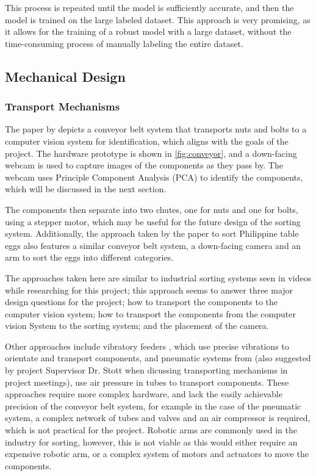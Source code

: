 This process is repeated until the model is sufficiently accurate, and then the model is trained on the large labeled dataset. This approach is very promising, as it allows for the training of a robust model with a large dataset, without the time-consuming process of manually labeling the entire dataset.

\subsection{Mechanical Design}

\subsubsection{Transport Mechanisms}
The paper by \citet{Dhenge2013MechanicalNS} depicts a conveyor belt system that transports nuts and bolts to a computer vision system for identification, which aligns with the goals of the project. 
The hardware prototype is shown in \autoref{fig:conveyor}, and a down-facing webcam is used to capture images of the components as they pass by. The webcam uses Principle Component Analysis (PCA) to identify the components,
which will be discussed in the next section.

The components then separate into two chutes, one for nuts and one for bolts, using a stepper motor, which may be useful for the future design of the sorting system.
Additionally, the approach taken by the paper \citet{eggsorting} to sort Philippine table eggs also features a similar conveyor belt system, a down-facing camera and an arm to sort the eggs into different categories. 

The approaches taken here are similar to industrial sorting systems seen in videos while researching for this project; this approach seems to answer three major design questions for the project;
how to transport the components to the computer vision system; how to transport the components from the computer vision System to the sorting system; and the placement of the camera.

Other approaches include vibratory feeders \cite{s21217280}, which use precise vibrations to orientate and transport components, and pneumatic systems from \citet{ASEC2023-16267} (also suggested by project Supervisor Dr. Stott when dicussing transporting mechanisms in project meetings), use air pressure in tubes to transport components.
These approaches require more complex hardware, and lack the easily achievable precision of the conveyor belt system, for example in the case of the pneumatic system, a complex network of tubes and valves and an air compressor
is required, which is not practical for the project. Robotic arms are commonly used in the industry for sorting, however, this is not viable as this would either require an expensive robotic arm, or a complex system of motors and actuators to move the components.

